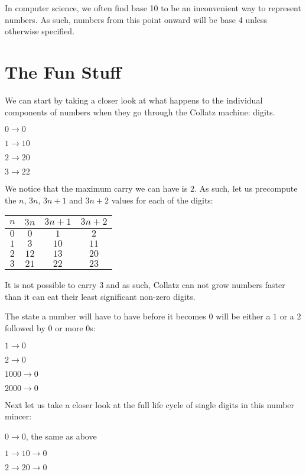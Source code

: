 \documentclass[10pt,a4paper,showpacs,nofootinbib,aps,superscriptaddress,eqsecnum,prd,showkeys,notitlepage]{article}
\begin{document}
In computer science, we often find base 10 to be an inconvenient way to represent numbers. As such, numbers from this point onward will be base 4 unless otherwise specified.

\section{The Fun Stuff}

We can start by taking a closer look at what happens to the individual components of numbers when they go through the Collatz machine: digits.

$0 \rightarrow 0$

$1 \rightarrow 10$

$2 \rightarrow 20$

$3 \rightarrow 22$

We notice that the maximum carry we can have is $2$. As such, let us precompute the $n$, $3n$, $3n+1$ and $3n+2$ values for each of the digits:

\begin{center}
\begin{tabular}{||c c c c||}
\hline
$n$ & $3n$ & $3n + 1$ & $3n + 2$ \\ [0.5ex]
\hline
\hline
$0$ & $0$ & $1$ & $2$\\
\hline
$1$ & $3$ & $10$ & $11$\\
\hline
$2$ & $12$ & $13$ & $20$\\
\hline
$3$ & $21$ & $22$ & $23$\\
\hline
\end{tabular}
\end{center}

It is not possible to carry $3$ and as such, Collatz can not grow numbers faster than it can eat their least significant non-zero digits.

The state a number will have to have before it becomes $0$ will be either a $1$ or a $2$ followed by 0 or more $0$s:

$1 \rightarrow 0$ 

$2 \rightarrow 0$

$1000 \rightarrow 0$

$2000 \rightarrow 0$

Next let us take a closer look at the full life cycle of single digits in this number mincer:   

$0 \rightarrow 0$, the same as above 

$1 \rightarrow 10 \rightarrow 0$

$2 \rightarrow 20 \rightarrow 0$
\end{document}
